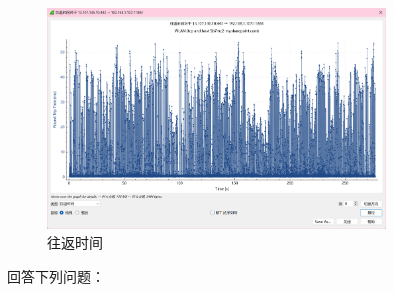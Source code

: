 \documentclass{article}
\begin{document}
\begin{figure}[H]
  \centering
  \includegraphics[width=0.8\textwidth]{img/14.png}
  \caption{往返时间}
\end{figure}

回答下列问题：
\end{document}
